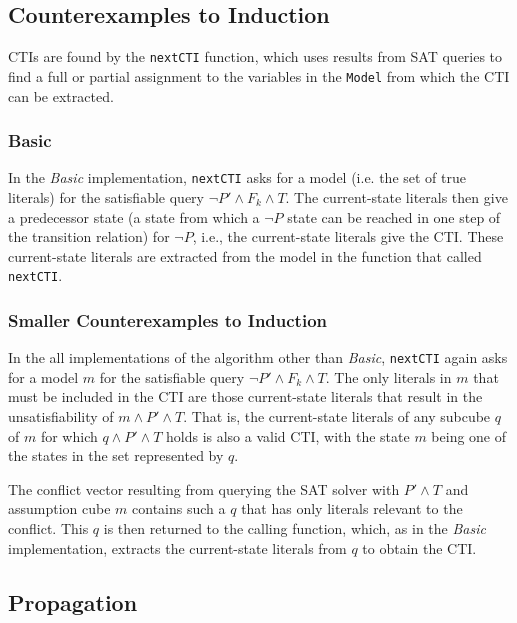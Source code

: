 \documentclass[12pt,a4paper,twoside,openright]{report}
\begin{document}
{\subsection{Counterexamples to Induction}

CTIs are found by the \verb,nextCTI, function, which
uses results from SAT queries to find a full or partial assignment to
the variables in the \verb,Model, from which the CTI can be extracted.

\subsubsection{Basic}
In the \emph{Basic} implementation, \verb,nextCTI, asks for a model
(i.e. the set of true literals) for the satisfiable query $\neg P' \wedge F_k \wedge T$.
The current-state literals then give a predecessor state (a state from which
a $\neg P$ state can be reached in one step of the transition relation) for $\neg P$,
i.e., the current-state literals give the CTI.
These current-state literals are extracted from the model in the function that
called \verb,nextCTI,.

\subsubsection{Smaller Counterexamples to Induction}
In the all implementations of the algorithm other than {\it Basic},
\verb,nextCTI, again asks for a model $m$
for the satisfiable query $\neg P' \wedge F_k \wedge T$. The only literals in $m$ that
must be included in the CTI are those current-state literals that result in
the unsatisfiability of $m \wedge P' \wedge T$. That is, the current-state literals of any
subcube $q$ of $m$ for which $q \wedge P' \wedge T$ holds is also a valid CTI, with
the state $m$ being one of the states in the set represented by $q$.

The conflict vector resulting from querying the SAT solver with $P' \wedge T$ and assumption
cube $m$ contains such a $q$ that has only literals relevant to the conflict. This $q$ is
then returned to the calling function, which, as in the \emph{Basic} implementation, extracts
the current-state literals from $q$ to obtain the CTI.


\subsection{Propagation}

}
\end{document}
